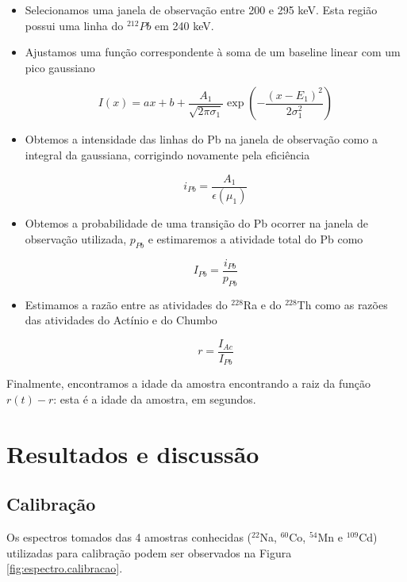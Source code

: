 \documentclass[a4paper, 11pt, notitlepage]{article}
\numberwithin{equation}{section}  %
\begin{document}
\begin{itemize}
 \item Selecionamos uma janela de observação entre 200 e 295 keV. Esta região possui uma linha do ${}^{212}Pb$ em 240 keV.
 \item Ajustamos uma função correspondente à soma de um baseline linear com um pico gaussiano

\begin{equation} I(x) = ax + b + \frac{A_1}{\sqrt{2\pi\sigma_1}} \exp\left(-\frac{(x-E_1)^2}{2\sigma_1^2}\right) \label{eq:um.pico}
\end{equation}

 \item Obtemos a intensidade das linhas do Pb na janela de observação como a integral da gaussiana, corrigindo novamente pela eficiência

\begin{equation}
 i_{Pb} = \frac{A_1}{\epsilon(\mu_1)}  \label{eq:i_Pb}
\end{equation}

 \item Obtemos a probabilidade de uma transição do Pb ocorrer na janela de observação utilizada, $p_{Pb}$ e estimaremos a atividade total do Pb como

\begin{equation}
 I_{Pb} = \frac{i_{Pb}}{p_{Pb}} \label{eq:I_Pb}
\end{equation}

 \item Estimamos a razão entre as atividades do ${}^{228}$Ra e do ${}^{228}$Th como as razões das atividades do Actínio e do Chumbo

$$ r = \frac{I_{Ac}}{I_{Pb}} $$
\end{itemize}

Finalmente, encontramos a idade da amostra encontrando a raiz da função $r(t) - r$: esta é a idade da amostra, em segundos.


\section{Resultados e discussão}

\subsection{Calibração}

Os espectros tomados das 4 amostras conhecidas (${}^{22}$Na, ${}^{60}$Co, ${}^{54}$Mn e ${}^{109}$Cd) utilizadas para calibração podem ser observados na Figura \ref{fig:espectro.calibracao}. 
\end{document}
